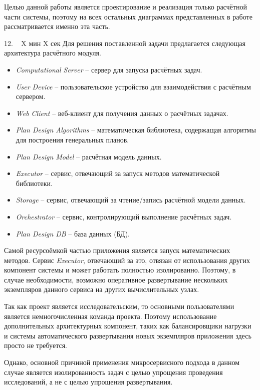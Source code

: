 \documentclass[11pt]{article}
\begin{document}
    Целью данной работы является проектирование и реализация только расчётной части системы, поэтому на всех остальных
    диаграммах представленных в работе рассматривается именно эта часть.

    12. ~ X мин X сек
    Для решения поставленной задачи предлагается следующая архитектура расчётного модуля.
    \begin{itemize}
        \item \textit{Computational Server} -- сервер для запуска расчётных задач.
        \item \textit{User Device} -- пользовательское устройство для взаимодействия с расчётным сервером.
        \item \textit{Web Client} -- веб-клиент для получения данных о расчётных задачах.
        \item \textit{Plan Design Algorithms} -- математическая библиотека, содержащая алгоритмы
        для построения генеральных планов.
        \item \textit{Plan Design Model} -- расчётная модель данных.
        \item \textit{Executor} -- сервис, отвечающий за запуск методов математической библиотеки.
        \item \textit{Storage} -- сервис, отвечающий за чтение/запись расчётной модели данных.
        \item \textit{Orchestrator} -- сервис, контролирующий выполнение расчётных задач.
        \item \textit{Plan Design DB} -- база данных (БД).
    \end{itemize}

    Самой ресурсоёмкой частью приложения является запуск математических методов.
    Сервис \textit{Executor}, отвечающий за это, отвязан от использования других компонент системы
    и может работать полностью изолированно.
    Поэтому, в случае необходимости, возможно оперативное развертывание нескольких экземпляров данного сервиса
    на других вычислительных узлах.

    Так как проект является исследовательским, то основными пользователями является немногочисленная команда проекта.
    Поэтому использование дополнительных архитектурных компонент,
    таких как балансировщики нагрузки и системы автоматического развертывания новых экземпляров приложения
    здесь просто не требуется.

    Однако, основной причиной применения микросервисного подхода в данном случае является изолированность задач с целью
    упрощения проведения исследований, а не с целью упрощения развертывания.
\end{document}
